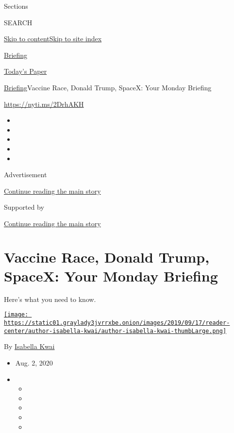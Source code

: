 Sections

SEARCH

\protect\hyperlink{site-content}{Skip to
content}\protect\hyperlink{site-index}{Skip to site index}

\href{https://www.nytimes3xbfgragh.onion/interactive/2018/briefing/global-morning-briefing-newsletter-signup.html}{Briefing}

\href{https://myaccount.nytimes3xbfgragh.onion/auth/login?response_type=cookie\&client_id=vi}{}

\href{https://www.nytimes3xbfgragh.onion/section/todayspaper}{Today's
Paper}

\href{/interactive/2018/briefing/global-morning-briefing-newsletter-signup.html}{Briefing}\textbar{}Vaccine
Race, Donald Trump, SpaceX: Your Monday Briefing

\url{https://nyti.ms/2DrhAKH}

\begin{itemize}
\item
\item
\item
\item
\item
\end{itemize}

Advertisement

\protect\hyperlink{after-top}{Continue reading the main story}

Supported by

\protect\hyperlink{after-sponsor}{Continue reading the main story}

\hypertarget{vaccine-race-donald-trump-spacex-your-monday-briefing}{%
\section{Vaccine Race, Donald Trump, SpaceX: Your Monday
Briefing}\label{vaccine-race-donald-trump-spacex-your-monday-briefing}}

Here's what you need to know.

\href{https://www.nytimes3xbfgragh.onion/by/isabella-kwai}{\texttt{[image: https://static01.graylady3jvrrxbe.onion/images/2019/09/17/reader-center/author-isabella-kwai/author-isabella-kwai-thumbLarge.png]}}

By \href{https://www.nytimes3xbfgragh.onion/by/isabella-kwai}{Isabella
Kwai}

\begin{itemize}
\item
  Aug. 2, 2020
\item
  \begin{itemize}
  \item
  \item
  \item
  \item
  \item
  \end{itemize}
\end{itemize}

